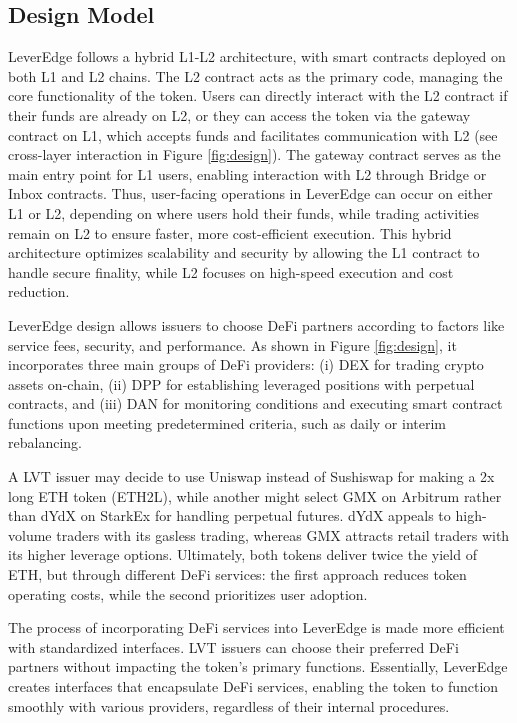 \subsection{Design Model}
LeverEdge follows a hybrid L1-L2 architecture, with smart contracts deployed on both L1 and L2 chains. The L2 contract acts as the primary code, managing the core functionality of the token. Users can directly interact with the L2 contract if their funds are already on L2, or they can access the token via the gateway contract on L1, which accepts funds and facilitates communication with L2 (see cross-layer interaction in Figure \ref{fig:design}). The gateway contract serves as the main entry point for L1 users, enabling interaction with L2 through Bridge or Inbox contracts. Thus, user-facing operations in LeverEdge can occur on either L1 or L2, depending on where users hold their funds, while trading activities remain on L2 to ensure faster, more cost-efficient execution. This hybrid architecture optimizes scalability and security by allowing the L1 contract to handle secure finality, while L2 focuses on high-speed execution and cost reduction.

LeverEdge design allows issuers to choose DeFi partners according to factors like service fees, security, and performance. As shown in Figure \ref{fig:design}, it incorporates three main groups of DeFi providers: (i) DEX for trading crypto assets on-chain, (ii) DPP for establishing leveraged positions with perpetual contracts, and (iii) DAN for monitoring conditions and executing smart contract functions upon meeting predetermined criteria, such as daily or interim rebalancing.

\begin{example}
	A LVT issuer may decide to use Uniswap instead of Sushiswap for making a 2x long ETH token (ETH2L), while another might select GMX on Arbitrum rather than dYdX on StarkEx for handling perpetual futures. dYdX appeals to high-volume traders with its gasless trading, whereas GMX attracts retail traders with its higher leverage options. Ultimately, both tokens deliver twice the yield of ETH, but through different DeFi services: the first approach reduces token operating costs, while the second prioritizes user adoption.
\end{example}

The process of incorporating DeFi services into LeverEdge is made more efficient with standardized interfaces. LVT issuers can choose their preferred DeFi partners without impacting the token's primary functions. Essentially, LeverEdge creates interfaces that encapsulate DeFi services, enabling the token to function smoothly with various providers, regardless of their internal procedures.

